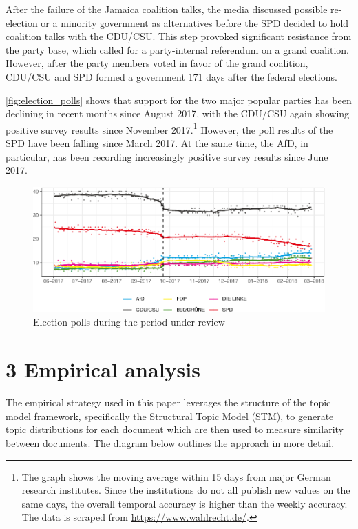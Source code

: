 \documentclass[
  12pt,
]{article}
\begin{document}
After the failure of the Jamaica coalition talks, the media discussed
possible re-election or a minority government as alternatives before the
SPD decided to hold coalition talks with the CDU/CSU. This step provoked
significant resistance from the party base, which called for a
party-internal referendum on a grand coalition. However, after the party
members voted in favor of the grand coalition, CDU/CSU and SPD formed a
government 171 days after the federal elections.

\autoref{fig:election_polls} shows that support for the two major
popular parties has been declining in recent months since August 2017,
with the CDU/CSU again showing positive survey results since November
2017.\footnote{The graph shows the moving average within 15 days from
  major German research institutes. Since the institutions do not all
  publish new values on the same days, the overall temporal accuracy is
  higher than the weekly accuracy. The data is scraped from
  \url{https://www.wahlrecht.de/}.} However, the poll results of the SPD
have been falling since March 2017. At the same time, the AfD, in
particular, has been recording increasingly positive survey results
since June 2017.

\begin{figure}

{\centering \includegraphics[width=0.8\linewidth]{chap1_files/figure-latex/election polls-1} 

}

\caption{Election polls during the period under review \label{fig:election_polls}}\label{fig:election polls}
\end{figure}

\pagebreak

\hypertarget{empirical-analysis}{%
\section{3 Empirical analysis}\label{empirical-analysis}}

The empirical strategy used in this paper leverages the structure of the
topic model framework, specifically the Structural Topic Model (STM), to
generate topic distributions for each document which are then used to
measure similarity between documents. The diagram below outlines the
approach in more detail.
\end{document}
